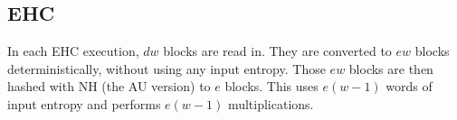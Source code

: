 \documentclass[sigconf, nonacm]{acmart}
\begin{document}


\subsection{EHC}

In each EHC execution, $d w$ blocks are read in.
They are converted to $e w$ blocks deterministically, without using any input entropy.
Those $e w$ blocks are then hashed with NH (the AU version) to $e$ blocks.
This uses $e(w - 1)$ words of input entropy and performs $e(w - 1)$ multiplications.
\end{document}
